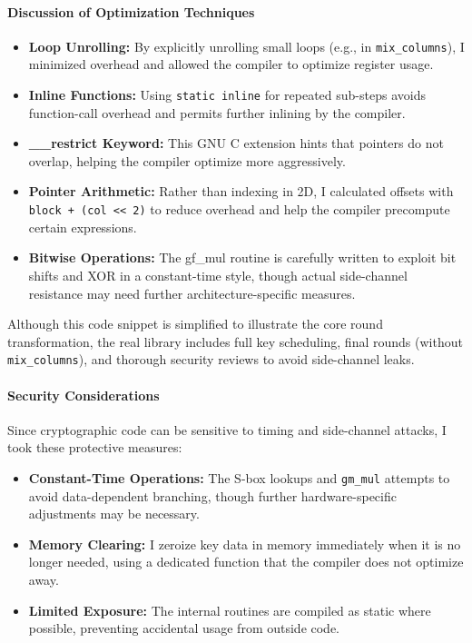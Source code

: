 \paragraph{Discussion of Optimization Techniques}

\begin{itemize}
	\item \textbf{Loop Unrolling:} By explicitly unrolling small loops (e.g., in \texttt{mix\_columns}), I minimized overhead and allowed the compiler to optimize register usage.
	\item \textbf{Inline Functions:} Using \texttt{static inline} for repeated sub-steps avoids function-call overhead and permits further inlining by the compiler.
	\item \textbf{\_\_restrict Keyword:} This GNU C extension hints that pointers do not overlap, helping the compiler optimize more aggressively.
	\item \textbf{Pointer Arithmetic:} Rather than indexing in 2D, I calculated offsets with \texttt{block + (col << 2)} to reduce overhead and help the compiler precompute certain expressions.
	\item \textbf{Bitwise Operations:} The gf\_mul routine is carefully written to exploit bit shifts and XOR in a constant-time style, though actual side-channel resistance may need further architecture-specific measures.
\end{itemize}

Although this code snippet is simplified to illustrate the core round transformation, the real library includes full key scheduling, final rounds (without \texttt{mix\_columns}), and thorough security reviews to avoid side-channel leaks.

\paragraph{Security Considerations}

Since cryptographic code can be sensitive to timing and side-channel attacks, I took these protective measures:

\begin{itemize}
	\item \textbf{Constant-Time Operations:} The S-box lookups and \texttt{gm\_mul} attempts to avoid data-dependent branching, though further hardware-specific adjustments may be necessary.
	\item \textbf{Memory Clearing:} I zeroize key data in memory immediately when it is no longer needed, using a dedicated function that the compiler does not optimize away.
	\item \textbf{Limited Exposure:} The internal routines are compiled as static where possible, preventing accidental usage from outside code.
\end{itemize}

